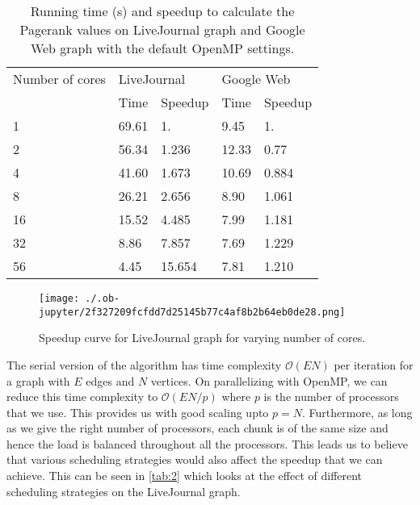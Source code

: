 \documentclass[11pt]{article}
\begin{document}
\begin{table}[htbp]
\caption{\label{tab:1}Running time (s) and speedup to calculate the Pagerank values on LiveJournal graph and Google Web graph with the default OpenMP settings.}
\centering
\begin{tabular}{|l|l|l|l|l|}
\hline
Number of cores & \multicolumn{2}{l|}{LiveJournal} & \multicolumn{2}{l|}{Google Web} \\
\cline{2-5}
 & Time & Speedup & Time & Speedup \\
\hline
1 & 69.61 & 1. & 9.45 & 1. \\
\hline
2 & 56.34 & 1.236 & 12.33 & 0.77 \\
\hline
4 & 41.60 & 1.673 & 10.69 & 0.884 \\
\hline
8 & 26.21 & 2.656 & 8.90 & 1.061 \\
\hline
16 & 15.52 & 4.485 & 7.99 & 1.181 \\
\hline
32 & 8.86 & 7.857 & 7.69 & 1.229 \\
\hline
56 & 4.45 & 15.654 & 7.81 & 1.210 \\
\hline
\end{tabular}
\end{table}

\begin{figure}[htbp]
\centering
\texttt{[image: ./.ob-jupyter/2f327209fcfdd7d25145b77c4af8b2b64eb0de28.png]}
\caption{\label{fig:speedup_par3}Speedup curve for LiveJournal graph for varying number of cores.}
\end{figure}

The serial version of the algorithm has time complexity \(\mathcal{O}(EN)\) per iteration for a graph with \(E\) edges and \(N\) vertices. On parallelizing with OpenMP, we can reduce this time complexity to \(\mathcal{O}(EN/p)\) where \(p\) is the number of processors that we use. This provides us with good scaling upto \(p = N\). Furthermore, as long as we give the right number of processors, each chunk is of the same size and hence the load is balanced throughout all the processors. This leads us to believe that various scheduling strategies would also affect the speedup that we can achieve. This can be seen in \ref{tab:2} which looks at the effect of different scheduling strategies on the LiveJournal graph.
\end{document}
